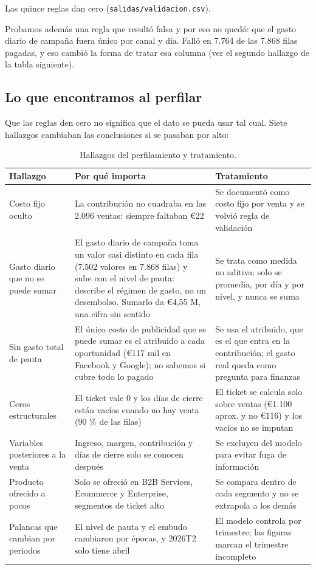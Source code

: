 \documentclass[11pt,letterpaper]{article}
\begin{document}
Las quince reglas dan cero (\texttt{salidas/validacion.csv}).

Probamos además una regla que resultó falsa y por eso no quedó: que el gasto diario de campaña fuera único
por canal y día. Falló en 7.764 de las 7.868 filas pagadas, y eso cambió la forma de tratar esa columna (ver el
segundo hallazgo de la tabla siguiente).

\subsection{Lo que encontramos al perfilar}

Que las reglas den cero no significa que el dato se pueda usar tal cual. Siete hallazgos cambiaban las
conclusiones si se pasaban por alto:

\begin{table}[!htbp]
\centering\small
\caption{Hallazgos del perfilamiento y tratamiento.}
\begin{tabularx}{\linewidth}{>{\raggedright\arraybackslash}p{3.1cm} L L}
\toprule
Hallazgo & Por qué importa & Tratamiento \\
\midrule
Costo fijo oculto & La contribución no cuadraba en las 2.096 ventas: siempre faltaban €22 & Se documentó como costo
fijo por venta y se volvió regla de validación \\
Gasto diario que no se puede sumar & El gasto diario de campaña toma un valor casi distinto en cada fila
(7.502 valores en 7.868 filas) y sube con el nivel de pauta: describe el régimen de gasto, no un desembolso.
Sumarlo da €4,55 M, una cifra sin sentido & Se trata como medida no aditiva: solo se promedia, por día y por
nivel, y nunca se suma \\
Sin gasto total de pauta & El único costo de publicidad que se puede sumar es el atribuido a cada oportunidad
(€117 mil en Facebook y Google); no sabemos si cubre todo lo pagado & Se usa el atribuido, que es el que entra
en la contribución; el gasto real queda como pregunta para finanzas \\
Ceros estructurales & El ticket vale 0 y los días de cierre están vacíos cuando no hay venta (90 \% de las
filas) & El ticket se calcula solo sobre ventas (€1.100 aprox. y no €116) y los vacíos no se imputan \\
Variables posteriores a la venta & Ingreso, margen, contribución y días de cierre solo se conocen después &
Se excluyen del modelo para evitar fuga de información \\
Producto ofrecido a pocos & Solo se ofreció en B2B Services, Ecommerce y Enterprise, segmentos de ticket alto &
Se compara dentro de cada segmento y no se extrapola a los demás \\
Palancas que cambian por periodos & El nivel de pauta y el embudo cambiaron por épocas, y 2026T2 solo tiene abril &
El modelo controla por trimestre; las figuras marcan el trimestre incompleto \\
\bottomrule
\end{tabularx}
\end{table}
\end{document}
